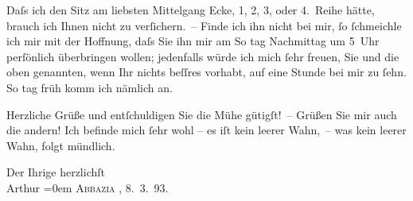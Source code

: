 \pstart
            Daſs ich den Sitz am liebsten Mittelgang Ecke, 1, 2, 3, oder 4. Reihe hätte,
                    brauch ich Ihnen nicht zu verſichern. – Finde ich ihn nicht bei mir, ſo
                    ſchmeichle ich mir mit der Hoffnung, daſs Sie ihn mir am  So {\geminationn} tag { }Nachmittag um 5 Uhr perſönlich überbringen wollen; jedenfalls würde
                    ich {\pb}mich ſehr freuen, Sie und die oben
                    genannten, wenn Ihr nichts beſſres vorhabt, auf eine Stunde bei mir zu ſehn. So
                        {\geminationn} tag früh komm ich nämlich an. \pend
           
\pstart
            Herzliche Grüße und entſchuldigen Sie die Mühe gütigſt! – Grüßen Sie mir auch
                    die andern! Ich befinde mich ſehr wohl – {\pb}es iſt
                    kein leerer Wahn, – was kein leerer Wahn, folgt mündlich. \pend
           
\pstart
            Der Ihrige herzlichſt {\\[\baselineskip]}\spacefill\mbox{Arthur}\pend
           \leftskip=0em{}
\pstart
           \textsc{Abbazia} , 8. 3. 93.\pend
           \endnumbering{}  
      